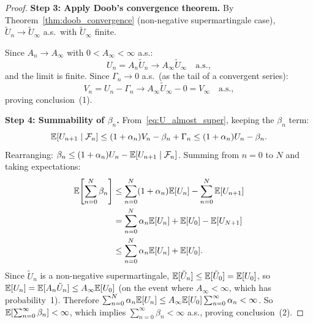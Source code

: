 \documentclass[11pt,a4paper]{article}
\begin{document}
\begin{proof}
\textbf{Step 3: Apply Doob's convergence theorem.}
By Theorem~\ref{thm:doob_convergence} (non-negative
supermartingale case), $\tilde{U}_n \to \tilde{U}_\infty$ a.s.\
with $\tilde{U}_\infty$ finite.

Since $A_n \to A_\infty$ with $0 < A_\infty < \infty$ a.s.:
\begin{equation}
  U_n = A_n \tilde{U}_n \to A_\infty \tilde{U}_\infty
  \quad \text{a.s.},
  \label{eq:U_converges}
\end{equation}
and the limit is finite.  Since $\Gamma_n \to 0$ a.s.\ (as the
tail of a convergent series):
\begin{equation}
  V_n = U_n - \Gamma_n \to A_\infty \tilde{U}_\infty - 0
  = V_\infty \quad \text{a.s.},
  \label{eq:V_converges}
\end{equation}
proving conclusion~(1).

\textbf{Step 4: Summability of $\beta_n$.}
From~\eqref{eq:U_almost_super}, keeping the $\beta_n$ term:
\begin{equation}
  \mathbb{E}[U_{n+1} \mid \mathcal{F}_n]
  \leq (1 + \alpha_n) V_n - \beta_n + \Gamma_n
  \leq (1 + \alpha_n) U_n - \beta_n.
\end{equation}
Rearranging: $\beta_n \leq (1 + \alpha_n) U_n -
\mathbb{E}[U_{n+1} \mid \mathcal{F}_n]$.  Summing from $n = 0$ to $N$
and taking expectations:
\begin{align}
  \mathbb{E}\!\left[\sum_{n=0}^N \beta_n\right]
  &\leq \sum_{n=0}^N (1 + \alpha_n) \mathbb{E}[U_n]
    - \sum_{n=0}^N \mathbb{E}[U_{n+1}]
  \nonumber\\
  &= \sum_{n=0}^N \alpha_n \mathbb{E}[U_n]
    + \mathbb{E}[U_0] - \mathbb{E}[U_{N+1}]
  \nonumber\\
  &\leq \sum_{n=0}^N \alpha_n \mathbb{E}[U_n] + \mathbb{E}[U_0].
  \label{eq:beta_sum_bound}
\end{align}
Since $\tilde{U}_n$ is a non-negative supermartingale,
$\mathbb{E}[\tilde{U}_n] \leq \mathbb{E}[\tilde{U}_0] = \mathbb{E}[U_0]$, so
$\mathbb{E}[U_n] = \mathbb{E}[A_n \tilde{U}_n] \leq A_\infty \mathbb{E}[U_0]$
(on the event where $A_\infty < \infty$, which has probability~1).
Therefore
$\sum_{n=0}^N \alpha_n \mathbb{E}[U_n]
\leq A_\infty \mathbb{E}[U_0] \sum_{n=0}^\infty \alpha_n < \infty$.
So $\mathbb{E}[\sum_{n=0}^\infty \beta_n] < \infty$, which implies
$\sum_{n=0}^\infty \beta_n < \infty$ a.s., proving
conclusion~(2).
\end{proof}
\end{document}

